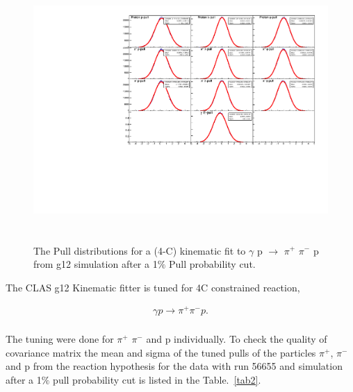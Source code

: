 \begin{figure}[ht!]
\centerline{
\includegraphics[width=12cm,height=10cm]{SIM_Pulls_nothing.pdf}}
\caption{The Pull distributions for a (4-C) kinematic fit to $\gamma$ p $\rightarrow$ $\pi^{+}$ $\pi^{-}$ p from g12 simulation after a 1$\%$ Pull probability cut.}
\label{Fig4}
\end{figure}
  
The CLAS g12 Kinematic fitter is tuned for 4C constrained reaction,

\begin{eqnarray*}
\gamma p \rightarrow \pi^{+} \pi^{-} p.
\end{eqnarray*}\\
\noindent
The tuning were done for $\pi^{+}$ $\pi^{-}$ and p individually. To check the quality of covariance matrix the mean and sigma of the tuned pulls of the particles $\pi^{+}$, $\pi^{-}$ and p from the reaction hypothesis for the data with run 56655 and simulation after a 1$\%$ pull probability cut is listed in the Table.~\ref{tab2}.

